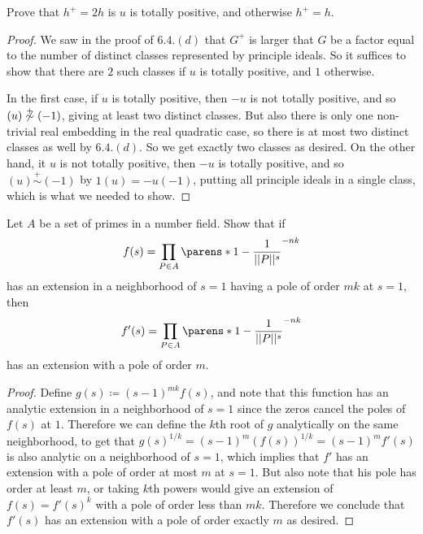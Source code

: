 \documentclass[11pt]{article}
\begin{document}
Prove that $h^+ = 2h$ is $u$ is totally positive, and otherwise $h^+ = h$.
\begin{proof}
  We saw in the proof of $6.4.(d)$ that $G^+$ is larger that $G$ be a factor equal to the number of distinct classes represented by principle ideals.
  So it suffices to show that there are $2$ such classes if $u$ is totally positive, and $1$ otherwise.

  In the first case, if $u$ is totally positive, then $-u$ is not totally positive, and so $(u) \not \overset{+}{\sim} (-1)$, giving at least two distinct classes.
  But also there is only one non-trivial real embedding in the real quadratic case, so there is at most two distinct classes as well by $6.4.(d)$.
  So we get exactly two classes as desired.
  On the other hand, it $u$ is not totally positive, then $-u$ is totally positive, and so $(u) \overset{+}{\sim} (-1)$ by $1(u) = -u(-1)$, putting all principle ideals in a single class, which is what we needed to show.
\end{proof}


Let $A$ be a set of primes in a number field.
Show that if $$f(s) = \prod_{P \in A} \parens*{1 - \frac{1}{||P||^s}}^{-nk}$$ has an extension in a neighborhood of $s = 1$ having a pole of order $mk$ at $s = 1$, then $$f'(s) = \prod_{P \in A} \parens*{1 - \frac{1}{||P||^s}}^{-nk}$$ has an extension with a pole of order $m$.
\begin{proof}
  Define $g(s) \coloneqq (s-1)^{mk}f(s)$, and note that this function has an analytic extension in a neighborhood of $s = 1$ since the zeros cancel the poles of $f(s)$ at $1$.
  Therefore we can define the $k$th root of $g$ analytically on the same neighborhood, to get that $g(s)^{1/k} = (s-1)^m(f(s))^{1/k} = (s-1)^m f'(s)$ is also analytic on a neighborhood of $s = 1$, which implies that $f'$ has an extension with a pole of order at most $m$ at $s = 1$.
  But also note that his pole has order at least $m$, or taking $k$th powers would give an extension of $f(s) = f'(s)^k$ with a pole of order less than $mk$.
  Therefore we conclude that $f'(s)$ has an extension with a pole of order exactly $m$ as desired.
\end{proof}
\end{document}
